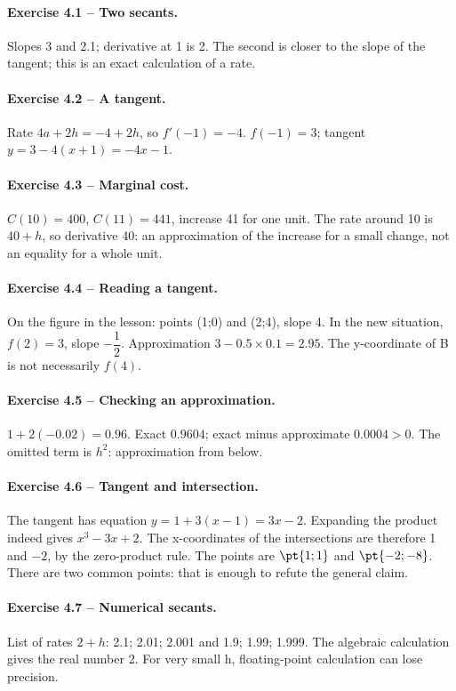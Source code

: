 \paragraph{Exercise 4.1 -- Two secants.} Slopes 3 and \num{2,1}; derivative at 1 is 2. The second is closer to the slope of the tangent; this is an exact calculation of a rate.
\paragraph{Exercise 4.2 -- A tangent.} Rate $4a+2h=-4+2h$, so $f\prime(-1)=-4$. $f(-1)=3$; tangent $y=3-4(x+1)=-4x-1$.
\paragraph{Exercise 4.3 -- Marginal cost.} $C(10)=400$, $C(11)=441$, increase 41 for one unit. The rate around 10 is $40+h$, so derivative 40: an approximation of the increase for a small change, not an equality for a whole unit.
\paragraph{Exercise 4.4 -- Reading a tangent.} On the figure in the lesson: points (1;0) and (2;4), slope 4. In the new situation, $f(2)=3$, slope $-\dfrac{1}{2}$. Approximation $3-\num{0,5}\times\num{0,1}=\num{2,95}$. The y-coordinate of B is not necessarily $f(4)$.
\paragraph{Exercise 4.5 -- Checking an approximation.} $1+2(-\num{0,02})=\num{0,96}$. Exact $\num{0,9604}$; exact minus approximate $\num{0,0004}>0$. The omitted term is $h^2$: approximation from below.
\paragraph{Exercise 4.6 -- Tangent and intersection.} The tangent has equation $y=1+3(x-1)=3x-2$. Expanding the product indeed gives $x^3-3x+2$. The x-coordinates of the intersections are therefore 1 and $-2$, by the zero-product rule. The points are $\pt{1;1}$ and $\pt{-2;-8}$. There are two common points: that is enough to refute the general claim.
\paragraph{Exercise 4.7 -- Numerical secants.} List of rates $2+h$: \num{2,1}; \num{2,01}; \num{2,001} and \num{1,9}; \num{1,99}; \num{1,999}. The algebraic calculation gives the real number 2. For very small h, floating-point calculation can lose precision.
